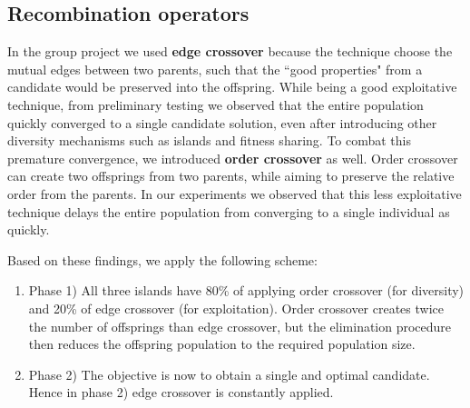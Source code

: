 \documentclass[a4paper,10pt]{article}
\newcommand{\ReplaceMe}[1]{{\color{blue}#1}}
\begin{document}
\subsection{Recombination operators}
	In the group project we used \textbf{edge crossover} because the technique choose the mutual edges between two parents, such that the ``good properties" from a candidate would be preserved into the offspring. While being a good exploitative technique, from preliminary testing we observed that the entire population quickly converged to a single candidate solution, even after introducing other diversity mechanisms such as islands and fitness sharing. To combat this premature convergence, we introduced \textbf{order crossover} as well. Order crossover can create two offsprings from two parents, while aiming to preserve the relative order from the parents. In our experiments we observed that this less exploitative technique delays the entire population from converging to a single individual as quickly.
	
	Based on these findings, we apply the following scheme:
	\begin{enumerate}
		\item Phase 1) All three islands have 80\% of applying order crossover (for diversity) and 20\% of edge crossover (for exploitation). Order crossover creates twice the number of offsprings than edge crossover, but the elimination procedure then reduces the offspring population to the required population size.
		\item Phase 2) The objective is now to obtain a single and optimal candidate. Hence in phase 2) edge crossover is constantly applied.
	\end{enumerate}


\end{document}
